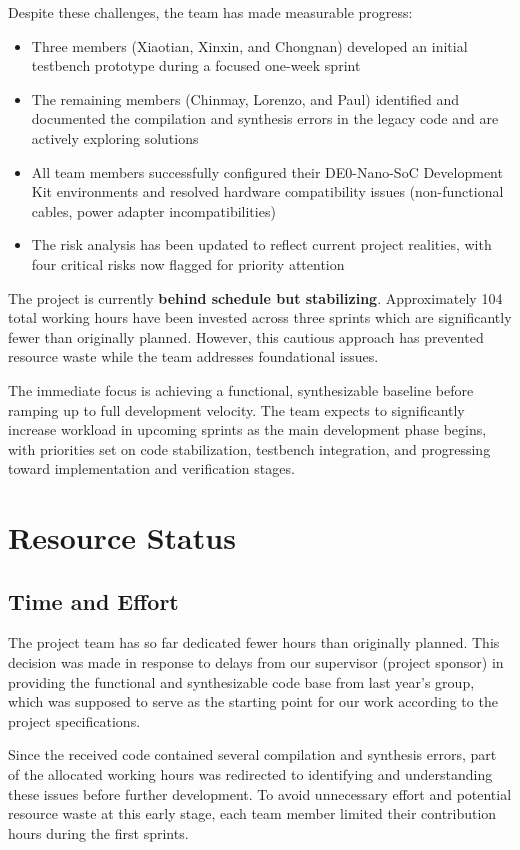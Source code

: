 \documentclass[10pt]{article}
\begin{document}
\noindent Despite these challenges, the team has made measurable progress:
\begin{itemize}
    \item Three members (Xiaotian, Xinxin, and Chongnan) developed an initial testbench prototype during a focused one-week sprint
    \item The remaining members (Chinmay, Lorenzo, and Paul) identified and documented the compilation and synthesis errors in the legacy code and are actively exploring solutions
    \item All team members successfully configured their DE0-Nano-SoC Development Kit environments and resolved hardware compatibility issues (non-functional cables, power adapter incompatibilities)
    \item The risk analysis has been updated to reflect current project realities, with four critical risks now flagged for priority attention
\end{itemize}


The project is currently \textbf{behind schedule but stabilizing}. Approximately 104 total working hours have been invested across three sprints which are significantly fewer than originally planned. However, this cautious approach has prevented resource waste while the team addresses foundational issues.

The immediate focus is achieving a functional, synthesizable baseline before ramping up to full development velocity. The team expects to significantly increase workload in upcoming sprints as the main development phase begins, with priorities set on code stabilization, testbench integration, and progressing toward implementation and verification stages.

\section{Resource Status}

\subsection{Time and Effort}
The project team has so far dedicated fewer hours than originally planned. This decision was made in response to delays from our supervisor (project sponsor) in providing the functional and synthesizable code base from last year’s group, which was supposed to serve as the starting point for our work according to the project specifications.

Since the received code contained several compilation and synthesis errors, part of the allocated working hours was redirected to identifying and understanding these issues before further development. To avoid unnecessary effort and potential resource waste at this early stage, each team member limited their contribution hours during the first sprints.
\end{document}
